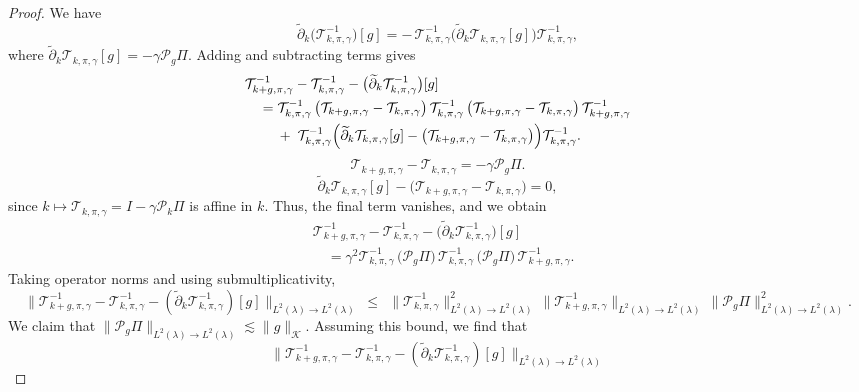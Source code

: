 \documentclass[11pt]{article}
\newcommand{\adk}{\widetilde{\partial}_k}
\theoremstyle{plain}
\begin{document}
\begin{proof}
We have
\[
\adk\bigl(\mathcal{T}_{k,\pi,\gamma}^{-1}\bigr)[g]
= -\,\mathcal{T}_{k,\pi,\gamma}^{-1}\bigl(\adk \mathcal{T}_{k,\pi,\gamma}[g]\bigr)\mathcal{T}_{k,\pi,\gamma}^{-1},
\]
where $\adk \mathcal{T}_{k,\pi,\gamma}[g] = - \gamma \mathcal{P}_{g}\Pi $.
Adding and subtracting terms gives
\begin{align*}
&\mathcal{T}_{k+g,\pi,\gamma}^{-1} - \mathcal{T}_{k,\pi,\gamma}^{-1} 
- \bigl(\adk \mathcal{T}_{k,\pi,\gamma}^{-1}\bigr)[g] \\
&\quad= \mathcal{T}_{k,\pi,\gamma}^{-1}\,\bigl(\mathcal{T}_{k+g,\pi,\gamma} - \mathcal{T}_{k,\pi,\gamma}\bigr)\,
\mathcal{T}_{k,\pi,\gamma}^{-1}\,\bigl(\mathcal{T}_{k+g,\pi,\gamma} - \mathcal{T}_{k,\pi,\gamma}\bigr)\,
\mathcal{T}_{k+g,\pi,\gamma}^{-1} \\
&\qquad\;+\;
\mathcal{T}_{k,\pi,\gamma}^{-1}\Bigl(\adk \mathcal{T}_{k,\pi,\gamma}[g] - 
\bigl(\mathcal{T}_{k+g,\pi,\gamma} - \mathcal{T}_{k,\pi,\gamma}\bigr)\Bigr)\mathcal{T}_{k,\pi,\gamma}^{-1}.
\end{align*}
\[
\mathcal{T}_{k+g,\pi,\gamma} - \mathcal{T}_{k,\pi,\gamma} = - \gamma \mathcal{P}_{g}\Pi .
\]
\[
\adk \mathcal{T}_{k,\pi,\gamma}[g] - 
\bigl(\mathcal{T}_{k+g,\pi,\gamma} - \mathcal{T}_{k,\pi,\gamma}\bigr) = 0,
\]
since \(k \mapsto \mathcal{T}_{k,\pi,\gamma} = I - \gamma \mathcal{P}_k \Pi\) is affine in \(k\).  
Thus, the final term vanishes, and we obtain
\begin{align*}
&\mathcal{T}_{k+g,\pi,\gamma}^{-1} - \mathcal{T}_{k,\pi,\gamma}^{-1} 
- \bigl(\adk \mathcal{T}_{k,\pi,\gamma}^{-1}\bigr)[g] \\
&\quad=  \gamma^2 \mathcal{T}_{k,\pi,\gamma}^{-1}\,\bigl( \mathcal{P}_{g}\Pi \bigr)\,
\mathcal{T}_{k,\pi,\gamma}^{-1}\,\bigl( \mathcal{P}_{g}\Pi \bigr)\,
\mathcal{T}_{k+g,\pi,\gamma}^{-1}.
\end{align*}
Taking operator norms and using submultiplicativity,
 \[
\bigl\|\mathcal{T}_{k+g,\pi,\gamma}^{-1} - \mathcal{T}_{k,\pi,\gamma}^{-1} 
- (\adk \mathcal{T}_{k,\pi,\gamma}^{-1})[g]\bigr\|_{L^2(\lambda)\to L^2(\lambda)}
\;\le\;  \,\|\mathcal{T}_{k,\pi,\gamma}^{-1}\|_{L^2(\lambda)\to L^2(\lambda)}^2 \,\|\mathcal{T}_{k+g,\pi,\gamma}^{-1}\|_{L^2(\lambda)\to L^2(\lambda)}\,
\|\mathcal{P}_{g}\Pi \|_{L^2(\lambda)\to L^2(\lambda)}^{2}.
\]
We claim that $\|\mathcal{P}_{g}\Pi \|_{L^2(\lambda) \rightarrow L^2(\lambda)} \lesssim \|g\|_{\mathcal{K}}$. Assuming this bound, we find that
\[
\bigl\|\mathcal{T}_{k+g,\pi,\gamma}^{-1} - \mathcal{T}_{k,\pi,\gamma}^{-1} 
- (\adk \mathcal{T}_{k,\pi,\gamma}^{-1})[g]\bigr\|_{L^2(\lambda)\to L^2(\lambda)}
\]
\end{proof}
\end{document}
